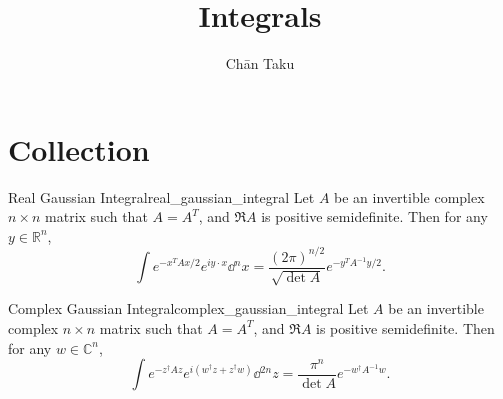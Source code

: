 \documentclass{article}
\title{Integrals}
\author{Ch\=an Taku}
\begin{document}
\maketitle

\section{Collection}

\begin{theorem}{Real Gaussian Integral}{real_gaussian_integral}
    Let $A$ be an invertible complex $n\times n$ matrix such that $A=A^T$,
    and $\Re A$ is positive semidefinite.
    Then for any $y\in \mathbb{R}^n$,
    \[ \int e^{-x^T A x / 2} e^{iy\cdot x} \dd{^n x} = \frac{(2\pi)^{n/2}}{\sqrt{\det A}} e^{-y^T A^{-1} y/2}. \]
\end{theorem}

\begin{theorem}{Complex Gaussian Integral}{complex_gaussian_integral}
    Let $A$ be an invertible complex $n\times n$ matrix such that $A=A^T$,
    and $\Re A$ is positive semidefinite.
    Then for any $w\in \mathbb{C}^n$,
    \[ \int e^{-z^\dagger A z} e^{i(w^\dagger z + z^\dagger w)} \dd{^{2n} z} = \frac{\pi^n}{\det A} e^{-w^\dagger A^{-1} w}. \]
\end{theorem}
\end{document}
